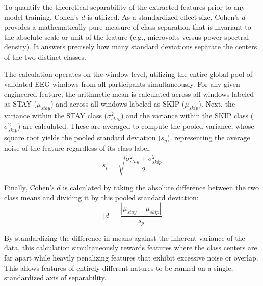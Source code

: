 To quantify the theoretical separability of the extracted features prior to any model training, Cohen's $d$ is utilized. As a standardized effect size, Cohen's $d$ provides a mathematically pure measure of class separation that is invariant to the absolute scale or unit of the feature (e.g., microvolts versus power spectral density). It answers precisely how many standard deviations separate the centers of the two distinct classes.

The calculation operates on the window level, utilizing the entire global pool of validated EEG windows from all participants simultaneously. For any given engineered feature, the arithmetic mean is calculated across all windows labeled as STAY ($\mu_{stay}$) and across all windows labeled as SKIP ($\mu_{skip}$). Next, the variance within the STAY class ($\sigma^2_{stay}$) and the variance within the SKIP class ($\sigma^2_{skip}$) are calculated. These are averaged to compute the pooled variance, whose square root yields the pooled standard deviation ($s_p$), representing the average noise of the feature regardless of its class label:
\[ s_p = \sqrt{\frac{\sigma^2_{stay} + \sigma^2_{skip}}{2}} \]

Finally, Cohen's $d$ is calculated by taking the absolute difference between the two class means and dividing it by this pooled standard deviation:
\[ |d| = \frac{|\mu_{stay} - \mu_{skip}|}{s_p} \]

By standardizing the difference in means against the inherent variance of the data, this calculation simultaneously rewards features where the class centers are far apart while heavily penalizing features that exhibit excessive noise or overlap. This allows features of entirely different natures to be ranked on a single, standardized axis of separability.

